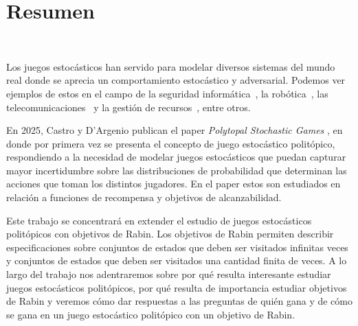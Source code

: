 \chapter*{Resumen}
~\label{abstract}
\vspace{-1cm}

Los juegos estocásticos han servido para modelar diversos sistemas del mundo
real donde se aprecia un comportamiento estocástico y adversarial. Podemos ver
ejemplos de estos en el campo de la seguridad informática~\cite{SGSecurity}, la
robótica~\cite{SGInteractive}, las telecomunicaciones~\cite{SGM2M} y la gestión
de recursos~\cite{SGSmartGrid}, entre otros.

En 2025, Castro y D'Argenio publican el paper \emph{Polytopal Stochastic Games}
\cite{Polytopal}, en donde por primera vez se presenta el concepto de juego
estocástico politópico, respondiendo a la necesidad de modelar juegos
estocásticos que puedan capturar mayor incertidumbre sobre las distribuciones
de probabilidad que determinan las acciones que toman los distintos jugadores.
En el paper estos son estudiados en relación a funciones de recompensa y
objetivos de alcanzabilidad.

Este trabajo se concentrará en extender el estudio de juegos estocásticos
politópicos con objetivos de Rabin. Los objetivos de Rabin permiten describir
especificaciones sobre conjuntos de estados que deben ser visitados infinitas
veces y conjuntos de estados que deben ser visitados una cantidad finita de
veces. A lo largo del trabajo nos adentraremos sobre por qué resulta
interesante estudiar juegos estocásticos politópicos, por qué resulta de
importancia estudiar objetivos de Rabin y veremos cómo dar respuestas a las
preguntas de quién gana y de cómo se gana en un juego estocástico politópico
con un objetivo de Rabin.